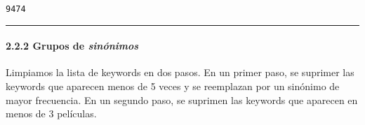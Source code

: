             \begin{tcolorbox}[breakable, size=fbox, boxrule=.5pt, pad at break*=1mm, opacityfill=0]
\begin{Verbatim}[commandchars=\\\{\}]
9474
\end{Verbatim}
\end{tcolorbox}
        
    \begin{center}\rule{0.5\linewidth}{0.5pt}\end{center}

\hypertarget{grupos-de-sinuxf3nimos}{%
\paragraph{\texorpdfstring{2.2.2 Grupos de
\emph{sinónimos}}{2.2.2 Grupos de sinónimos}}\label{grupos-de-sinuxf3nimos}}

Limpiamos la lista de keywords en dos pasos. En un primer paso, se
suprimer las keywords que aparecen menos de 5 veces y se reemplazan por
un sinónimo de mayor frecuencia. En un segundo paso, se suprimen las
keywords que aparecen en menos de 3 películas.

